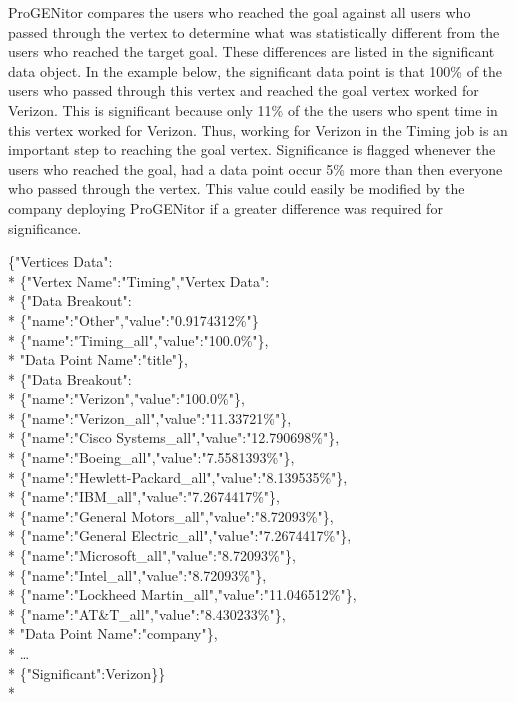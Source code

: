 ProGENitor compares the users who reached the goal against all users who passed
through the vertex to determine what was statistically different from the users
who reached the target goal.  These differences are listed in the significant
data object. In the example below, the significant data point is that 100\% of
the users who passed through this vertex and reached the goal vertex worked for
Verizon.  This is significant because only 11\% of the the users who spent time
in this vertex worked for Verizon.  Thus, working for Verizon in the Timing job is
an important step to reaching the goal vertex.  Significance is flagged whenever
the users who reached the goal, had a data point occur 5\% more than then
everyone who passed through the vertex.  This value could easily be modified by
the company deploying ProGENitor if a greater difference was required for significance.

\pagebreak
\begin{tt}
\begin{footnotesize}
\noindent \{"Vertices Data":\\*
	\indent \{"Vertex Name":"Timing","Vertex Data":\\*
		\indent \{"Data Breakout":\\*
		\indent \indent	\{"name":"Other","value":"0.9174312\%"\}\\*
		\indent	\indent \{"name":"Timing\_all","value":"100.0\%"\},\\*
		\indent	"Data Point Name":"title"\},\\*
		\indent\{"Data Breakout":\\*
		\indent	\indent	\{"name":"Verizon","value":"100.0\%"\},\\*
		\indent	\indent	\{"name":"Verizon\_all","value":"11.33721\%"\},\\*
		\indent	\indent	\{"name":"Cisco Systems\_all","value":"12.790698\%"\},\\*
		\indent	\indent	\{"name":"Boeing\_all","value":"7.5581393\%"\},\\*
		\indent	\indent	\{"name":"Hewlett-Packard\_all","value":"8.139535\%"\},\\*
		\indent	\indent	\{"name":"IBM\_all","value":"7.2674417\%"\},\\*
		\indent	\indent	\{"name":"General Motors\_all","value":"8.72093\%"\},\\*
		\indent	\indent	\{"name":"General Electric\_all","value":"7.2674417\%"\},\\*
		\indent	\indent	\{"name":"Microsoft\_all","value":"8.72093\%"\},\\*
		\indent	\indent	\{"name":"Intel\_all","value":"8.72093\%"\},\\*
		\indent	\indent	\{"name":"Lockheed Martin\_all","value":"11.046512\%"\},\\*
		\indent	\indent	\{"name":"AT\&T\_all","value":"8.430233\%"\},\\*
		\indent"Data Point Name":"company"\},\\*
		\indent\ldots\\*
		\indent \{"Significant":Verizon\}\}\\*
\end{footnotesize}
\end{tt}

